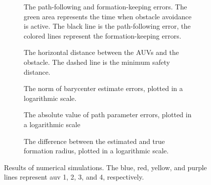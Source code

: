 \begin{figure}[!ht]
    \begin{minipage}{0.48\textwidth}
        \begin{subfigure}{\textwidth}
            
            \vspace{-7mm}
            \caption{The path-following and formation-keeping errors. The green area represents the time when obstacle avoidance is active.
            The black line is the path-following error, the colored lines represent the formation-keeping errors.}
            \label{fig:distr_NSB_sim_errors}
        \end{subfigure}

        \begin{subfigure}{\textwidth}
            
            \vspace{-7mm}
            \caption{The horizontal distance between the AUVs and the obstacle. The dashed line is the minimum safety distance.}
            \label{fig:distr_NSB_sim_distance}
        \end{subfigure}
        \vspace{-7mm}
    \end{minipage}
    \hspace{\fill}
    \begin{minipage}{0.48\textwidth}
        \begin{subfigure}{\textwidth}
            \hspace*{-0.7mm}
            
            \vspace{-2mm}
            \caption{The norm of barycenter estimate errors, plotted in a logarithmic scale.}
            \label{fig:distr_NSB_sim_barycenter}
        \end{subfigure}
    
        \begin{subfigure}{\textwidth}
            \hspace*{-2mm}
            
            \vspace{-2mm}
            \caption{The absolute value of path parameter errors, plotted in a logarithmic scale}
            \label{fig:distr_NSB_sim_parameter}
        \end{subfigure}

        \begin{subfigure}{\textwidth}
            \hspace*{-1mm}
            
            \vspace{-2mm}
            \caption{The difference between the estimated and true formation radius, plotted in a logarithmic scale.}
            \label{fig:distr_NSB_sim_radius}
        \end{subfigure}
        \vspace{-7mm}
    \end{minipage}

    \caption{Results of numerical simulations. The blue, red, yellow, and purple lines represent \gls{auv} 1, 2, 3, and 4, respectively.}
    \label{fig:distr_NSB_simulation}
\end{figure}

